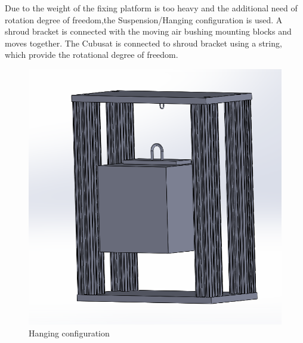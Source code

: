 Due to the weight of the fixing platform is too heavy and the additional need of rotation degree of freedom,the Suspension/Hanging configuration is used. A shroud bracket is connected with the moving air bushing mounting blocks and moves together. The Cubusat is connected to shroud bracket using a string, which provide the rotational degree of freedom. 

\begin{figure}[H]
\centering
\includegraphics[width=0.3\linewidth]{fig/DOE/Hang}
\caption{Hanging configuration} 
\end{figure} 

\newpage
